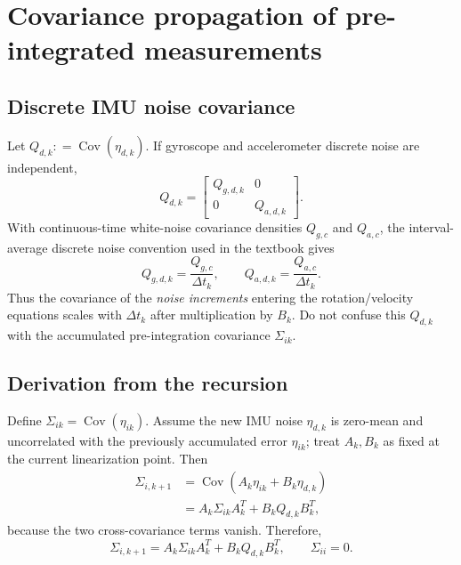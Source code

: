 \documentclass[11pt,a4paper]{article}
\newcommand{\defeq}{\mathrel{\mathop:}=}
\begin{document}
\section{Covariance propagation of pre-integrated measurements}
\subsection{Discrete IMU noise covariance}
Let $Q_{d,k}\defeq\operatorname{Cov}(\eta_{d,k})$.
If gyroscope and accelerometer discrete noise are independent,
\begin{equation}
Q_{d,k}=\begin{bmatrix}
Q_{g,d,k}&0\\0&Q_{a,d,k}
\end{bmatrix}.
\end{equation}
With continuous-time white-noise covariance densities $Q_{g,c}$ and
$Q_{a,c}$, the interval-average discrete noise convention used in the
textbook gives
\begin{equation}
Q_{g,d,k}=\frac{Q_{g,c}}{\Delta t_k},\qquad
Q_{a,d,k}=\frac{Q_{a,c}}{\Delta t_k}.
\end{equation}
Thus the covariance of the \emph{noise increments} entering the
rotation/velocity equations scales with $\Delta t_k$ after multiplication
by $B_k$. Do not confuse this $Q_{d,k}$ with the accumulated
pre-integration covariance $\Sigma_{ik}$.

\subsection{Derivation from the recursion}
Define $\Sigma_{ik}=\operatorname{Cov}(\eta_{ik})$.
Assume the new IMU noise $\eta_{d,k}$ is zero-mean and uncorrelated
with the previously accumulated error $\eta_{ik}$; treat $A_k,B_k$
as fixed at the current linearization point. Then
\begin{align}
\Sigma_{i,k+1}
&=\operatorname{Cov}(A_k\eta_{ik}+B_k\eta_{d,k})\\
&=A_k\Sigma_{ik}A_k^T+B_kQ_{d,k}B_k^T,
\end{align}
because the two cross-covariance terms vanish. Therefore,
\begin{equation}\label{eq:preint_cov}
\boxed{\Sigma_{i,k+1}=A_k\Sigma_{ik}A_k^T+B_kQ_{d,k}B_k^T,
\qquad \Sigma_{ii}=0.}
\end{equation}
\end{document}
